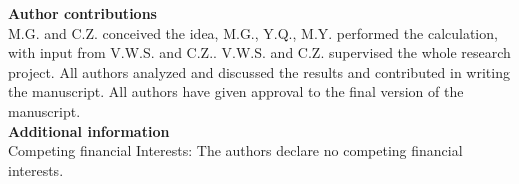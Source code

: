 \documentclass[a4paper,showpacs]{revtex4}
\begin{document}
{\noindent\textbf {Author contributions}}\\
M.G. and C.Z. conceived the idea, M.G., Y.Q., M.Y. performed the calculation, with input from V.W.S. and C.Z.. V.W.S. and C.Z. supervised the whole research project. All authors analyzed and discussed the results and contributed in writing the manuscript. All authors have given approval to the final version of the manuscript.\\

{\noindent\bf{Additional information}}\\
{ Competing financial Interests:} The authors declare no competing financial interests.
\end{document}
